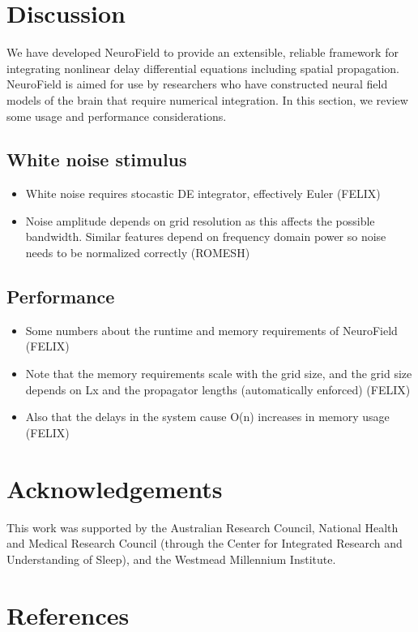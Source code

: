 \documentclass[preprint,review,10pt,authoryear,letterpaper]{elsarticle}
\begin{document}
\section{Discussion}
\label{sec:discussion}

We have developed NeuroField to provide an extensible, reliable framework for integrating nonlinear delay differential equations including spatial propagation. NeuroField is aimed for use by researchers who have constructed neural field models of the brain that require numerical integration. In this section, we review some usage and performance considerations.

\subsection{White noise stimulus}
\begin{itemize}
	\item White noise requires stocastic DE integrator, effectively Euler (FELIX)
	\item Noise amplitude depends on grid resolution as this affects the possible bandwidth. Similar features depend on frequency domain power so noise needs to be normalized correctly (ROMESH)
\end{itemize}

\subsection{Performance}

\begin{itemize}
\item Some numbers about the runtime and memory requirements of NeuroField (FELIX)
\item Note that the memory requirements scale with the grid size, and the grid size depends on Lx and the propagator lengths (automatically enforced) (FELIX)
\item Also that the delays in the system cause O(n) increases in memory usage (FELIX)
\end{itemize}


\section{Acknowledgements}
\label{sec:acknowledgements}
This work was supported by the Australian Research Council, National Health and Medical Research Council (through the Center for Integrated Research and Understanding of Sleep), and the Westmead Millennium Institute.

\section{References}


\end{document}
